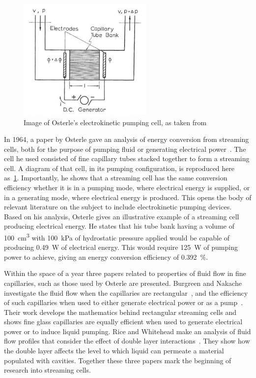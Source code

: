     \begin{figure}
      \centering
      \includegraphics[height=6cm]{content/pt1/Osterle_ElectrokineticCell.png}
      \caption{\label{fig:Osterle_cell}Image of Osterle's electrokinetic pumping cell, as taken from \cite{Osterle1964}}
    \end{figure}
    In 1964, a paper by Osterle gave an analysis of energy conversion from streaming cells, both for the purpose of pumping fluid or generating electrical power~\cite{Osterle1964}.
    The cell he used consisted of fine capillary tubes stacked together to form a streaming cell.
    A diagram of that cell, in its pumping configuration, is reproduced here as~\cref{fig:Osterle_cell}.
    Importantly, he shows that a streaming cell has the same conversion efficiency whether it is in a pumping mode, where electrical energy is supplied, or in a generating mode, where electrical energy is produced.
    This opens the body of relevant literature on the subject to include electrokinetic pumping devices.
    Based on his analysis, Osterle gives an illustrative example of a streaming cell producing electrical energy.
    He states that his tube bank having a volume of \SI{100}{\centi\meter\cubed} with \SI{100}{\kilo\pascal} of hydrostatic pressure applied would be capable of producing \SI{0.49}{\watt} of electrical energy.
    This would require \SI{125}{\watt} of pumping power to achieve, giving an energy conversion efficiency of \SI{0.392}{\percent}.


    Within the space of a year three papers related to properties of fluid flow in fine capillaries, such as those used by Osterle are presented.
    Burgreen and Nakache investigate the fluid flow when the capillaries are rectangular~\cite{Burgreen1964}, and the efficiency of such capillaries when used to either generate electrical power or as a pump~\cite{Burgreen1965}.
    Their work develops the mathematics behind rectangular streaming cells and shows fine glass capillaries are equally efficient when used to generate electrical power or to induce liquid pumping.
    Rice and Whitehead make an analysis of fluid flow profiles that consider the effect of double layer interactions~\cite{Rice1965}.
    They show how the double layer affects the level to which liquid can permeate a material populated with cavities.
    Together these three papers mark the beginning of research into streaming cells.

